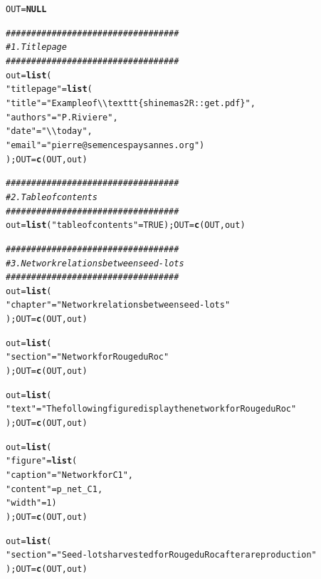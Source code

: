 \documentclass{article}\usepackage[]{graphicx}\usepackage[]{color}
\makeatletter
\newcommand{\hlnum}[1]{\textcolor[rgb]{0.686,0.059,0.569}{#1}}%
\newcommand{\hlstr}[1]{\textcolor[rgb]{0.192,0.494,0.8}{#1}}%
\newcommand{\hlcom}[1]{\textcolor[rgb]{0.678,0.584,0.686}{\textit{#1}}}%
\newcommand{\hlstd}[1]{\textcolor[rgb]{0.345,0.345,0.345}{#1}}%
\newcommand{\hlkwa}[1]{\textcolor[rgb]{0.161,0.373,0.58}{\textbf{#1}}}%
\newcommand{\hlkwb}[1]{\textcolor[rgb]{0.69,0.353,0.396}{#1}}%
\newcommand{\hlkwd}[1]{\textcolor[rgb]{0.737,0.353,0.396}{\textbf{#1}}}%
\newenvironment{kframe}{%
 \def\at@end@of@kframe{}%
 \ifinner\ifhmode%
  \def\at@end@of@kframe{\end{minipage}}%
  \begin{minipage}{\columnwidth}%
 \fi\fi%
 \def\FrameCommand##1{\hskip\@totalleftmargin \hskip-\fboxsep
 \colorbox{shadecolor}{##1}\hskip-\fboxsep
     \hskip-\linewidth \hskip-\@totalleftmargin \hskip\columnwidth}%
 \MakeFramed {\advance\hsize-\width
   \@totalleftmargin\z@ \linewidth\hsize
   \@setminipage}}%
 {\par\unskip\endMakeFramed%
 \at@end@of@kframe}
\newenvironment{knitrout}{}{} %
\makeatother
\begin{document}
\begin{knitrout}
\color{fgcolor}\begin{kframe}
\begin{alltt}
\hlstd{OUT} \hlkwb{=} \hlkwa{NULL}

\hlcom{##################################}
\hlcom{# 1. Title page }
\hlcom{##################################}
\hlstd{out} \hlkwb{=} \hlkwd{list}\hlstd{(}
        \hlstr{"titlepage"} \hlstd{=} \hlkwd{list}\hlstd{(}
                \hlstr{"title"} \hlstd{=} \hlstr{"Example of \textbackslash{}\textbackslash{}texttt\{shinemas2R::get.pdf\}"}\hlstd{,}
                \hlstr{"authors"} \hlstd{=} \hlstr{"P. Riviere"}\hlstd{,}
                \hlstr{"date"} \hlstd{=} \hlstr{"\textbackslash{}\textbackslash{}today"}\hlstd{,}
                \hlstr{"email"} \hlstd{=} \hlstr{"pierre@semencespaysannes.org"}\hlstd{)}
        \hlstd{); OUT} \hlkwb{=} \hlkwd{c}\hlstd{(OUT, out)}


\hlcom{##################################}
\hlcom{# 2. Table of contents}
\hlcom{##################################}
\hlstd{out} \hlkwb{=} \hlkwd{list}\hlstd{(}\hlstr{"tableofcontents"} \hlstd{=} \hlnum{TRUE}\hlstd{); OUT} \hlkwb{=} \hlkwd{c}\hlstd{(OUT, out)}


\hlcom{##################################}
\hlcom{# 3. Network relations between seed-lots}
\hlcom{##################################}
\hlstd{out} \hlkwb{=} \hlkwd{list}\hlstd{(}
        \hlstr{"chapter"} \hlstd{=} \hlstr{"Network relations between seed-lots"}
        \hlstd{); OUT} \hlkwb{=} \hlkwd{c}\hlstd{(OUT, out)}

\hlstd{out} \hlkwb{=} \hlkwd{list}\hlstd{(}
        \hlstr{"section"} \hlstd{=} \hlstr{"Network for Rouge du Roc"}
        \hlstd{); OUT} \hlkwb{=} \hlkwd{c}\hlstd{(OUT, out)}

\hlstd{out} \hlkwb{=} \hlkwd{list}\hlstd{(}
        \hlstr{"text"} \hlstd{=} \hlstr{"The following figure display the network for Rouge du Roc"}
        \hlstd{); OUT} \hlkwb{=} \hlkwd{c}\hlstd{(OUT, out)}

\hlstd{out} \hlkwb{=} \hlkwd{list}\hlstd{(}
        \hlstr{"figure"} \hlstd{=} \hlkwd{list}\hlstd{(}
                \hlstr{"caption"} \hlstd{=} \hlstr{"Network for C1"}\hlstd{,}
                \hlstr{"content"} \hlstd{= p_net_C1,}
                \hlstr{"width"} \hlstd{=} \hlnum{1}\hlstd{)}
        \hlstd{); OUT} \hlkwb{=} \hlkwd{c}\hlstd{(OUT, out)}

\hlstd{out} \hlkwb{=} \hlkwd{list}\hlstd{(}
        \hlstr{"section"} \hlstd{=} \hlstr{"Seed-lots harvested for Rouge du Roc after a reproduction"}
        \hlstd{); OUT} \hlkwb{=} \hlkwd{c}\hlstd{(OUT, out)}


\end{alltt}
\end{kframe}
\end{knitrout}
\end{document}
